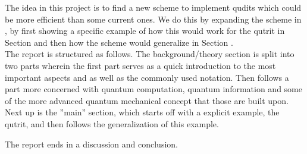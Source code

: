 The idea in this project is to find a new scheme to implement qudits which could be more efficient than some current ones.  We do this by expanding the scheme in \cite{darkpath}, by first showing a specific example of how this would work for the qutrit in Section  and then how the scheme would generalize in Section . 
\\
The report is structured as follows. The background/theory section is split into two parts wherein the first part serves as a quick introduction to the most important aspects and as well as the commonly used notation. Then follows a part more concerned with quantum computation, quantum information and some of the more advanced quantum mechanical concept that those are built upon.
Next up is the ''main'' section, which starts off with a explicit example, the qutrit, and then follows the generalization of this example. 

The report ends in a discussion and conclusion.
